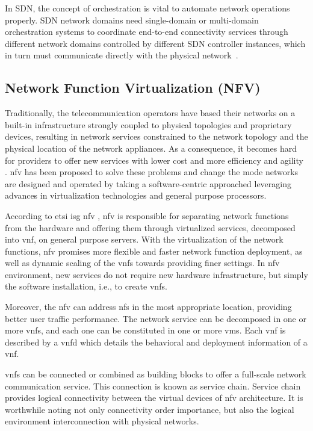 In SDN, the concept of orchestration is vital to automate network operations properly. SDN network domains need single-domain or multi-domain orchestration systems to coordinate end-to-end connectivity services through different network domains controlled by different SDN controller instances, which in turn must communicate directly with the physical network~\cite{SDNevolution}.

\subsection{Network Function Virtualization (NFV)}
\label{subsec:nfv}
Traditionally, the telecommunication operators have based their networks on a built-in infrastructure strongly coupled to physical topologies and proprietary devices, resulting in network services constrained to the network topology and the physical location of the network appliances. As a consequence, it becomes hard for providers to offer new services with lower cost and more efficiency and agility \cite{Mijumbi2016NetworkChallenges}. \acrlong{nfv} has been proposed to solve these problems \cite{ETSI2012NetworkAction} and change the mode networks are designed and operated by taking a software-centric approached leveraging advances in virtualization technologies and general purpose processors.

According to \gls{etsi} \gls{isg} \gls{nfv} \cite{ETSIIndustrySpecificationGroupISGNFV2014NetworkNFV},  \acrlong{nfv} is responsible for separating network functions from the hardware and offering them through virtualized services, decomposed into \gls{vnf}, on general purpose servers. With the virtualization of the network functions, \gls{nfv} promises more flexible and faster network function deployment, as well as dynamic scaling of the \glspl{vnf} towards providing finer settings. In \gls{nfv} environment, new services do not require new hardware infrastructure, but simply the software installation, i.e., to create \glspl{vnf}.

Moreover, the \gls{nfv} can address \glspl{nf} in the most appropriate location, providing better user traffic performance. The network service can be decomposed in one or more \glspl{vnf}, and each one can be constituted in one or more \glspl{vm}. Each \gls{vnf} is described by a \gls{vnfd} which details the behavioral and deployment information of a \gls{vnf}.

\glspl{vnf} can be connected or combined as building blocks to offer a full-scale network communication service. This connection is known as service chain. Service chain provides logical connectivity between the virtual devices of \gls{nfv} architecture. It is worthwhile noting not only connectivity order importance, but also the logical environment interconnection with physical networks. 

